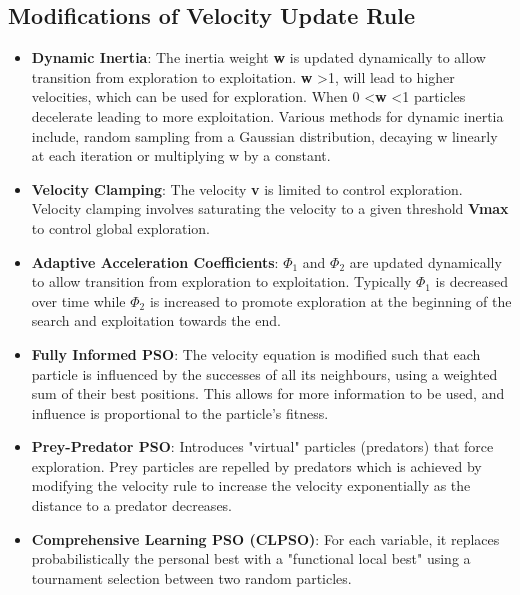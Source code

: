 \subsection*{Modifications of Velocity Update Rule}
\begin{itemize}
    \item \textbf{Dynamic Inertia}: The inertia weight \textbf{w} is updated dynamically to allow transition from exploration to exploitation. \textbf{w} \textgreater 1, will lead to higher velocities, which can be used for exploration. When 0 \textless \textbf{w} \textless 1 particles decelerate leading to more exploitation. Various methods for dynamic inertia include, random sampling from a Gaussian distribution, decaying w linearly at each iteration or multiplying w by a constant.
    \item \textbf{Velocity Clamping}: The velocity \textbf{v} is limited to control exploration. Velocity clamping involves saturating the velocity to a given threshold \textbf{Vmax} to control global exploration.
    \item \textbf{Adaptive Acceleration Coefficients}: $\Phi_1$ and $\Phi_2$ are updated dynamically to allow transition from exploration to exploitation. Typically $\Phi_1$ is decreased over time while $\Phi_2$ is increased to promote exploration at the beginning of the search and exploitation towards the end.
    \item \textbf{Fully Informed PSO}: The velocity equation is modified such that each particle is influenced by the successes of all its neighbours, using a weighted sum of their best positions. This allows for more information to be used, and influence is proportional to the particle’s fitness.
    \item \textbf{Prey-Predator PSO}: Introduces "virtual" particles (predators) that force exploration. Prey particles are repelled by predators which is achieved by modifying the velocity rule to increase the velocity exponentially as the distance to a predator decreases.
    \item \textbf{Comprehensive Learning PSO (CLPSO)}: For each variable, it replaces probabilistically the personal best with a "functional local best" using a tournament selection between two random particles.
\end{itemize}

